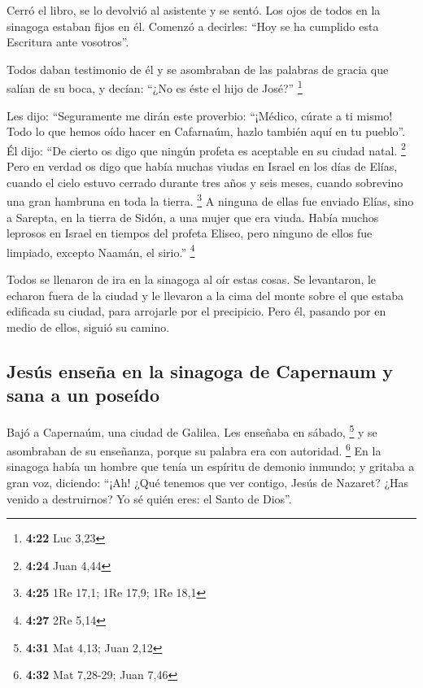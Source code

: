  Cerró el libro, se lo devolvió al asistente y se sentó.
Los ojos de todos en la sinagoga estaban fijos en él. 
Comenzó a decirles: ``Hoy se ha cumplido esta Escritura ante vosotros''.

 Todos daban testimonio de él y se asombraban de las
palabras de gracia que salían de su boca, y decían: ``¿No es éste el
hijo de José?'' \footnote{\textbf{4:22} Luc 3,23}

 Les dijo: ``Seguramente me dirán este proverbio:
``¡Médico, cúrate a ti mismo! Todo lo que hemos oído hacer en Cafarnaúm,
hazlo también aquí en tu pueblo''.  Él dijo: ``De cierto
os digo que ningún profeta es aceptable en su ciudad natal. \footnote{\textbf{4:24}
  Juan 4,44}  Pero en verdad os digo que había muchas
viudas en Israel en los días de Elías, cuando el cielo estuvo cerrado
durante tres años y seis meses, cuando sobrevino una gran hambruna en
toda la tierra. \footnote{\textbf{4:25} 1Re 17,1; 1Re 17,9; 1Re 18,1}
 A ninguna de ellas fue enviado Elías, sino a Sarepta, en
la tierra de Sidón, a una mujer que era viuda.  Había
muchos leprosos en Israel en tiempos del profeta Eliseo, pero ninguno de
ellos fue limpiado, excepto Naamán, el sirio.'' \footnote{\textbf{4:27}
  2Re 5,14}

 Todos se llenaron de ira en la sinagoga al oír estas
cosas.  Se levantaron, le echaron fuera de la ciudad y le
llevaron a la cima del monte sobre el que estaba edificada su ciudad,
para arrojarle por el precipicio.  Pero él, pasando por
en medio de ellos, siguió su camino.

\hypertarget{jesuxfas-enseuxf1a-en-la-sinagoga-de-capernaum-y-sana-a-un-poseuxeddo}{%
\subsection{Jesús enseña en la sinagoga de Capernaum y sana a un
poseído}\label{jesuxfas-enseuxf1a-en-la-sinagoga-de-capernaum-y-sana-a-un-poseuxeddo}}

 Bajó a Capernaúm, una ciudad de Galilea. Les enseñaba en
sábado, \footnote{\textbf{4:31} Mat 4,13; Juan 2,12}  y
se asombraban de su enseñanza, porque su palabra era con autoridad.
\footnote{\textbf{4:32} Mat 7,28-29; Juan 7,46}  En la
sinagoga había un hombre que tenía un espíritu de demonio inmundo; y
gritaba a gran voz,  diciendo: ``¡Ah! ¿Qué tenemos que
ver contigo, Jesús de Nazaret? ¿Has venido a destruirnos? Yo sé quién
eres: el Santo de Dios''.

